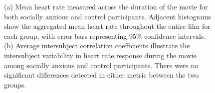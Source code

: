 \begin{figure}[!ht]
	\centering
	\caption{(a) Mean heart rate measured across the duration of the movie for both socially anxious and control participants. Adjacent histograms show the aggregated mean heart rate throughout the entire film for each group, with error bars representing 95\% confidence intervals. (b) Average intersubject correlation coefficients illustrate the intersubject variability in heart rate response during the movie among socially anxious and control participants. There were no significant differences detected in either metric between the two groups.}
    \vspace*{-10pt}
	\label{fig:heart-rate}
\end{figure}

